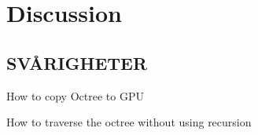 
\chapter{Discussion}


\section{SVÅRIGHETER}

How to copy Octree to GPU

How to traverse the octree without using recursion

